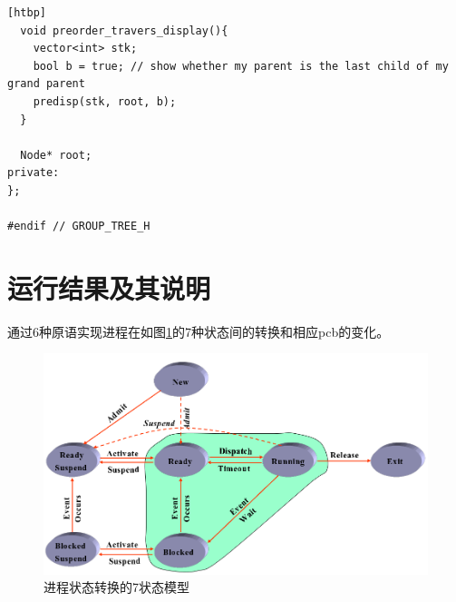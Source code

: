 \documentclass[11pt]{article}
\begin{document}
\begin{center}
\begin{lstlisting}[caption = {\texttt{group\_tree.h}代码清单}, label = {lst: group_tree_h}][htbp]
  void preorder_travers_display(){
    vector<int> stk;
    bool b = true; // show whether my parent is the last child of my grand parent
    predisp(stk, root, b);
  }

  Node* root;
private:
};

#endif // GROUP_TREE_H
\end{lstlisting}
\end{center}

\section{运行结果及其说明}
通过6种原语实现进程在如图\ref{fig: process}的7种状态间的转换和相应pcb的变化。
\begin{center}
\begin{figure}[htbp]
\includegraphics[width=\textwidth]{process.png}
\caption{进程状态转换的7状态模型}
\label{fig: process}
\end{figure}
\end{center}
\end{document}
